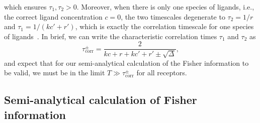which ensures $\tau_1,\tau_2>0$.
Moreover, when there is only one species of ligands, i.e., the correct ligand concentration $c=0$, the two timescales degenerate to $\tau_2=1/r$ and $\tau_1=1/(kc'+r')$, which is exactly the correlation timescale for one species of ligands~\cite{kashyap2024trade}.
In brief, we can write the characteristic correlation times $\tau_1$ and $\tau_2$ as
\begin{equation}\label{eq:ch5:t-corr}
    \tau_\textrm{corr}^\pm=\frac{2}{kc+r+kc'+r'\pm\sqrt{\Delta}},
\end{equation}
and expect that for our semi-analytical calculation of the Fisher information to be valid, we must be in the limit $T \gg \tau^\pm_\textrm{corr}$ for all receptors.


\subsection{Semi-analytical calculation of Fisher information}
\label{sec:ch5:fisher}

